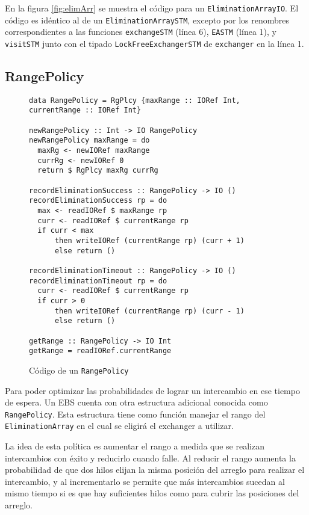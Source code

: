 En la figura \ref{fig:elimArr} se muestra el código para un \texttt{EliminationArrayIO}. El código es idéntico al de un \texttt{EliminationArraySTM}, excepto por los renombres correspondientes a las funciones \texttt{exchangeSTM} (línea 6), \texttt{EASTM} (línea 1), y \texttt{visitSTM} junto con el tipado \texttt{LockFreeExchangerSTM} de \texttt{exchanger} en la línea 1.

\subsection{RangePolicy}
\begin{figure}[t]
  \centering
  \begin{verbatim}
data RangePolicy = RgPlcy {maxRange :: IORef Int, currentRange :: IORef Int}

newRangePolicy :: Int -> IO RangePolicy
newRangePolicy maxRange = do
  maxRg <- newIORef maxRange
  currRg <- newIORef 0
  return $ RgPlcy maxRg currRg

recordEliminationSuccess :: RangePolicy -> IO ()
recordEliminationSuccess rp = do
  max <- readIORef $ maxRange rp
  curr <- readIORef $ currentRange rp
  if curr < max
      then writeIORef (currentRange rp) (curr + 1)
      else return ()

recordEliminationTimeout :: RangePolicy -> IO ()
recordEliminationTimeout rp = do
  curr <- readIORef $ currentRange rp
  if curr > 0
      then writeIORef (currentRange rp) (curr - 1)
      else return ()

getRange :: RangePolicy -> IO Int
getRange = readIORef.currentRange
  \end{verbatim}
  \caption{Código de un \texttt{RangePolicy}}
  \label{fig:range-policy}
\end{figure}

Para poder optimizar las probabilidades de lograr un intercambio en ese tiempo de espera. Un EBS cuenta con otra estructura adicional conocida como \texttt{RangePolicy}. Esta estructura tiene como función manejar el rango del \texttt{EliminationArray} en el cual se eligirá el exchanger a utilizar.

La idea de esta política es aumentar el rango a medida que se realizan intercambios con éxito y reducirlo cuando falle.
Al reducir el rango aumenta la probabilidad de que dos hilos elijan la misma posición del arreglo para realizar el intercambio, y al incrementarlo se permite que más intercambios sucedan al mismo tiempo si es que hay suficientes hilos como para cubrir las posiciones del arreglo.

